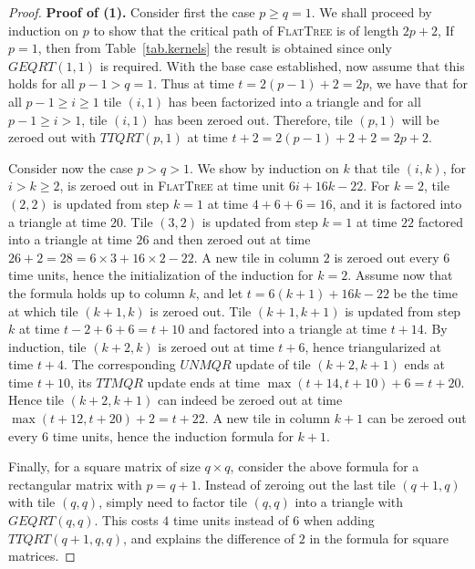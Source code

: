 \documentclass[a4paper,twopages]{article}
\newcommand{\GEQRT}{\ensuremath{\mathit{GEQRT}}\xspace}
\newcommand{\UNMQR}{\ensuremath{\mathit{UNMQR}}\xspace}
\newcommand{\TTQRT}{\ensuremath{\mathit{TTQRT}}\xspace}
\newcommand{\TTMQR}{\ensuremath{\mathit{TTMQR}}\xspace}
\newcommand{\FT}{\textsc{FlatTree}\xspace}
\begin{document}
\begin{proof}
\textbf{Proof of (1).}
    Consider first the case $p \geq q = 1$. We shall proceed by
    induction on $p$ to show that the critical path of \FT is of length $2p+2$,
    If $p=1$, then from Table~\ref{tab.kernels} the result
    is obtained since only $\GEQRT(1,1)$ is required.  With the base case
    established, now assume that this holds for all $p-1 > q = 1$.  Thus at
    time $t=2(p-1) + 2 = 2p$, we have that for all $p-1 \geq i \geq 1$ tile
    $(i,1)$ has been factorized into a triangle and for all $p-1 \geq i > 1$,
    tile $(i,1)$ has been zeroed out.  Therefore, tile $(p,1)$ will be zeroed
    out with $\TTQRT(p,1)$ at time $t+2 = 2(p-1) + 2 + 2 = 2p + 2$.

    Consider now the case $p > q >1$. We show by induction on $k$ that tile $(i,k)$, for $i>k\geq2$, is zeroed
    out in \FT at time unit $6i + 16k - 22$.  For $k=2$, tile $(2,2)$ is updated from step $k=1$
    at time $4+6+6=16$, and it is factored into a triangle at time $20$. Tile
    $(3,2)$ is updated from step $k=1$ at time $22$ factored into a triangle at
    time $26$ and then zeroed out at time $26+2=28= 6\times 3+16 \times 2 -
    22$. A new tile in column $2$ is zeroed out every $6$ time units, hence the
    initialization of the induction for $k=2$.
    Assume now that the formula holds up to column $k$, and let $t=6(k+1) + 16k
    -22$ be the time at which tile $(k+1,k)$ is zeroed out.  Tile $(k+1,k+1)$
    is updated from step $k$ at time $t-2+6+6=t+10$ and factored into a
    triangle at time $t+14$. By induction, tile $(k+2,k)$ is zeroed out at time
    $t+6$, hence triangularized at time $t+4$. The corresponding $\UNMQR$
    update of tile $(k+2,k+1)$ ends at time $t+10$, its $\TTMQR$ update ends at
    time $\max(t+14,t+10)+6=t+20$.  Hence tile $(k+2,k+1)$ can indeed be zeroed
    out at time $\max(t+12,t+20)+2=t+22$. A new tile in column $k+1$ can be
    zeroed out every $6$ time units, hence the induction formula for $k+1$.

    Finally, for a square matrix of size $q \times q$, consider the above formula for a
    rectangular matrix with $p=q+1$. Instead of zeroing out the last tile
    $(q+1,q)$ with tile $(q,q)$,
    simply need to factor tile $(q,q)$ into a triangle with $\GEQRT(q,q)$. This
    costs $4$ time units instead of $6$ when adding $\TTQRT(q+1,q,q)$, and explains the difference of $2$ in
    the formula for square matrices.


\end{proof}
\end{document}
